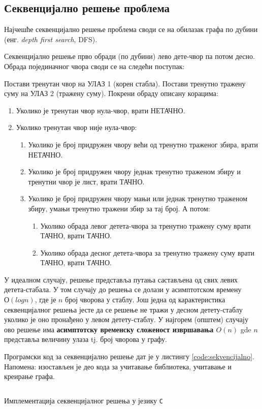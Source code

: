 \subsection{Секвенцијално решење проблема}

Најчешће секвенцијално решење проблема своди се на обилазак графа по дубини (енг. \textit{depth first search}, DFS).

Секвенцијално решење прво обради (по дубини) лево дете-чвор па потом десно.
Обрада појединачног чвора своди се на следећи поступак:

Постави тренутан чвор на УЛАЗ 1 (корен стабла). Постави тренутно тражену суму на УЛАЗ 2 (тражену суму).
Покрени обраду описану корацима:

\begin{enumerate}
    \item Уколико је тренутан чвор нула-чвор, врати НЕТАЧНО.
    \item Уколико тренутан чвор није нула-чвор:
    \begin{enumerate}
        \item Уколико је број придружен чвору већи од тренутно траженог збира, врати НЕТАЧНО.
        \item Уколико је број придружен чвору једнак тренутно траженом збиру и тренутни чвор је лист, врати ТАЧНО.
        \item Уколико је број придружен чвору мањи или једнак тренутно траженом збиру, умањи тренутно тражени збир за тај број. А потом:
        \begin{enumerate}
            \item Уколико обрада левог детета-чвора за тренутно тражену суму врати ТАЧНО, врати ТАЧНО.
            \item Уколико обрада десног детета-чвора за тренутно тражену суму врати ТАЧНО, врати ТАЧНО.
        \end{enumerate}
    \end{enumerate}
\end{enumerate}

У идеалном случају, решење представља путања састављена од свих левих детета-стабала. У том случају до решења се долази у асимптотском времену $О(log n)$,
где је $n$ број чворова у стаблу. Још једна од карактеристика секвенцијалног решења јесте да се решење не тражи у десном детету-стаблу уколико је оно
пронађено у левом детету-стаблу.
У најгорем (општем) случају ово решење има \textbf{асимптотску временску сложеност извршавања $O(n)$} gde $n$ представља величину улаза tj. број чворова у графу.

Програмски код за секвенцијално решење дат је у листингу \ref{code:sekvencijalno}. Напомена: изостављен је део кода за учитавање библиотека, учитавање и креирање графа.

\begin{listing}
\inputminted{c}{kodovi/basic.c}
\caption{Имплементација секвенцијалног решења у језику \texttt{C}}
\label{code:sekvencijalno}
\end{listing}

\pagebreak
